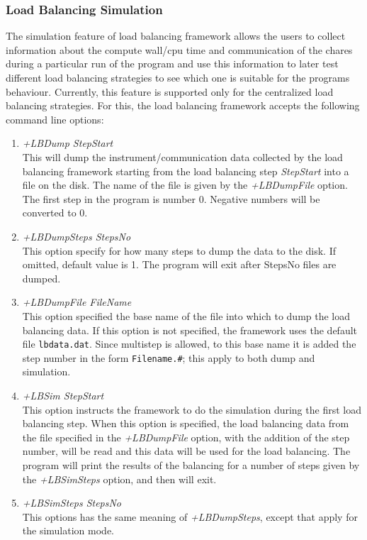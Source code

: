 \subsubsection{Load Balancing Simulation}
The simulation feature of load balancing framework allows the users to collect information
about the compute wall/cpu time and communication of the chares during a particular run of
the program and use this information to later test different load balancing strategies to
see which one is suitable for the programs behaviour. Currently, this feature is supported only for
the centralized load balancing strategies. For this, the load balancing framework
accepts the following command line options:
\begin{enumerate}
\item {\em +LBDump StepStart}\\
        This will dump the instrument/communication data collected by the load balancing framework
	starting from the load balancing step {\em StepStart} into a file on the disk. The name of the file
	is given by the {\em +LBDumpFile} option. The first step in the program is number 0. Negative
	numbers will be converted to 0.
\item {\em +LBDumpSteps StepsNo}\\
        This option specify for how many steps to dump the data to the disk. If omitted, default value is 1.
	The program will exit after StepsNo files are dumped.
\item {\em +LBDumpFile FileName}\\
	This option specified the base name of the file into which to dump the load balancing data. If this
	option is not specified, the framework uses the default file {\tt lbdata.dat}. Since multistep is allowed,
	to this base name it is added the step number in the form {\tt Filename.\#}; this apply to both dump and
	simulation.
\item {\em +LBSim StepStart}\\
	This option instructs the framework to do the simulation during the first load balancing step.
	When this option is specified, the load balancing data from the file specified in the {\em +LBDumpFile}
	option, with the addition of the step number, will be read and this data
	will be used for the load balancing. The program will print the results
	of the balancing for a number of steps given by the {\em +LBSimSteps} option, and then will exit.
\item {\em +LBSimSteps StepsNo}\\
        This options has the same meaning of {\em +LBDumpSteps}, except that apply for the simulation mode.

\end{enumerate}
